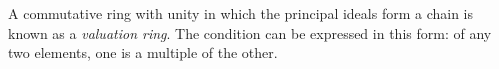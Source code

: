 A commutative ring with unity in which the principal ideals form a chain is known as a \textit{valuation ring}. The condition can be expressed in this form: of any two elements, one is a multiple of the other.
